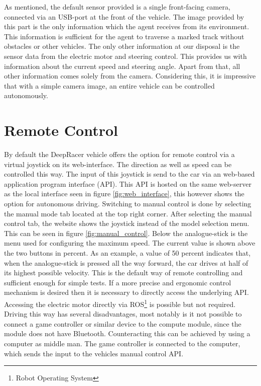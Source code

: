 As mentioned, the default sensor provided is a single front-facing camera, connected via an USB-port at the front of the vehicle. The image provided by this part is the only information which the agent receives from its environment. This information is sufficient for the agent to traverse a marked track without obstacles or other vehicles. The only other information at our disposal is the sensor data from the electric motor and steering control. This provides us with information about the current speed and steering angle. Apart from that, all other information comes solely from the camera. Considering this, it is impressive that with a simple camera image, an entire vehicle can be controlled autonomously.

\section{Remote Control}
By default the DeepRacer vehicle offers the option for remote control via a virtual joystick on its web-interface. The direction as well as speed can be controlled this way. The input of this joystick is send to the car via an web-based application program interface (API). This API is hosted on the same web-server as the local interface seen in figure \ref{fig:web_interface}, this however shows the option for autonomous driving. Switching to manual control is done by selecting the manual mode tab located at the top right corner. After selecting the manual control tab, the website shows the joystick instead of the model selection menu. This can be seen in figure \ref{fig:manual_control}. Below the analogue-stick is the menu used for configuring the maximum speed. The current value is shown above the two buttons in percent. As an example, a value of 50 percent indicates that, when the analogue-stick is pressed all the way forward, the car drives at half of its highest possible velocity. This is the default way of remote controlling and sufficient enough for simple tests. If a more precise and ergonomic control mechanism is desired then it is necessary to directly access the underlying API. Accessing the  electric motor directly via ROS\footnote{Robot Operating System} is possible but not required. Driving this way has several disadvantages, most notably is it not possible to connect a game controller or similar device to the compute module, since the module does not have Bluetooth. Counteracting this can be achieved by using a computer as middle man. The game controller is connected to the computer, which sends the input to the vehicles manual control API.

